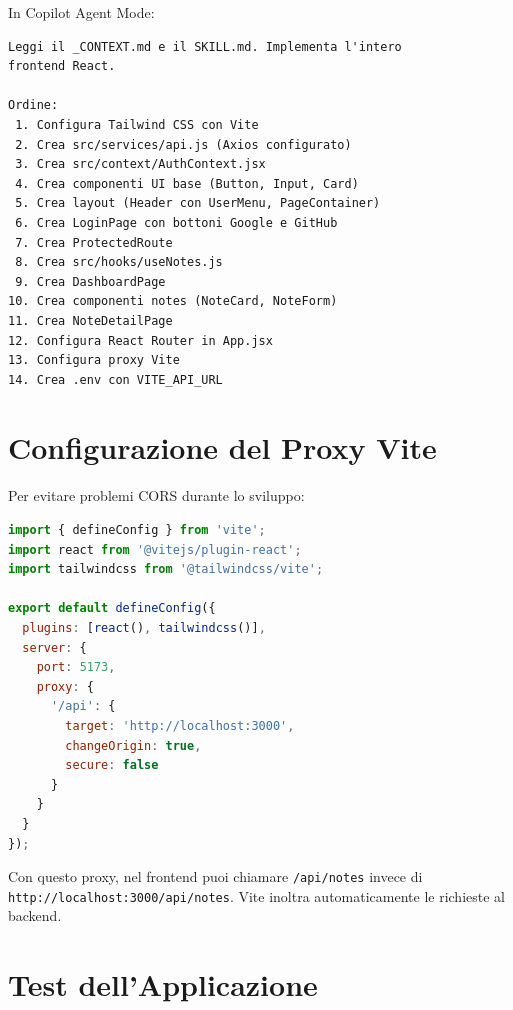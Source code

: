 \begin{praticabox}[title={Pratica --- Generare l'applicazione}]
In Copilot Agent Mode:
\begin{lstlisting}[language={}]
Leggi il _CONTEXT.md e il SKILL.md. Implementa l'intero
frontend React.

Ordine:
 1. Configura Tailwind CSS con Vite
 2. Crea src/services/api.js (Axios configurato)
 3. Crea src/context/AuthContext.jsx
 4. Crea componenti UI base (Button, Input, Card)
 5. Crea layout (Header con UserMenu, PageContainer)
 6. Crea LoginPage con bottoni Google e GitHub
 7. Crea ProtectedRoute
 8. Crea src/hooks/useNotes.js
 9. Crea DashboardPage
10. Crea componenti notes (NoteCard, NoteForm)
11. Crea NoteDetailPage
12. Configura React Router in App.jsx
13. Configura proxy Vite
14. Crea .env con VITE_API_URL
\end{lstlisting}
\end{praticabox}

\section{Configurazione del Proxy Vite}

Per evitare problemi CORS durante lo sviluppo:

\begin{lstlisting}[language=JavaScript,title={\texttt{vite.config.js}}]
import { defineConfig } from 'vite';
import react from '@vitejs/plugin-react';
import tailwindcss from '@tailwindcss/vite';

export default defineConfig({
  plugins: [react(), tailwindcss()],
  server: {
    port: 5173,
    proxy: {
      '/api': {
        target: 'http://localhost:3000',
        changeOrigin: true,
        secure: false
      }
    }
  }
});
\end{lstlisting}

\begin{tipbox}
Con questo proxy, nel frontend puoi chiamare \texttt{/api/notes} invece di \texttt{http://localhost:3000/api/notes}. Vite inoltra automaticamente le richieste al backend.
\end{tipbox}

\section{Test dell'Applicazione}

